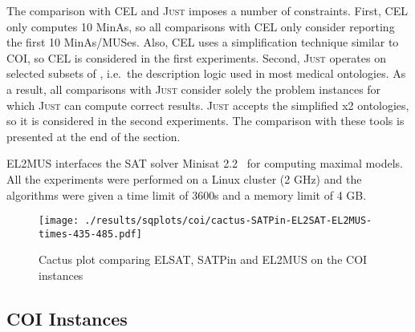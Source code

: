 \documentclass{llncs}
\newcommand{\elplus}{\xspace}
\newcommand{\elsat}{ELSAT\xspace}
\newcommand{\just}{\textsc{Just}\xspace}
\begin{document}
The comparison with CEL and \just imposes a number of constraints.
First, CEL only computes 10 MinAs, so all comparisons with
CEL only consider reporting the first 10 MinAs/MUSes. Also, CEL uses
a simplification technique similar to COI, so CEL is considered in the first
 experiments.
Second, \just operates on selected subsets of \elplus, i.e.\ the
description logic used in most medical ontologies. As a result, all
comparisons with \just consider solely the problem instances for which
\just can compute correct results. \just accepts the simplified x2 ontologies, 
so it is considered in the second experiments.
The comparison with these tools is presented at the end of the section.

EL2MUS interfaces the SAT solver Minisat 2.2~\cite{een-sat03} for computing maximal models. All the experiments were performed on a Linux cluster (2 GHz) and the 
algorithms were given a time limit of 3600s and a memory limit of 4
GB.



\begin{figure}[t]
  \centering
  \texttt{[image: ./results/sqplots/coi/cactus-SATPin-EL2SAT-EL2MUS-times-435-485.pdf]} \caption{Cactus plot comparing \elsat, SATPin and
    EL2MUS on the COI instances} \label{fig:cactus-coi}
\end{figure}


\subsection{COI Instances}
\end{document}
